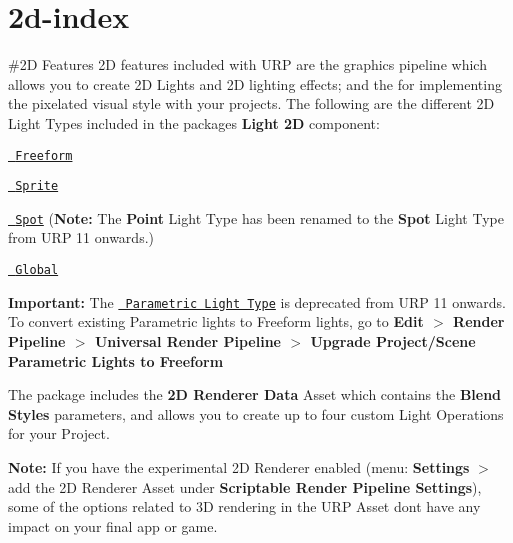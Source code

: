 \chapter{2d-\/index}
\hypertarget{md__hey_tea_9_2_library_2_package_cache_2com_8unity_8render-pipelines_8universal_0d14_80_88_2_documentation_0i_22d-index}{}\label{md__hey_tea_9_2_library_2_package_cache_2com_8unity_8render-pipelines_8universal_0d14_80_88_2_documentation_0i_22d-index}
\#2D  Features 2D features included with URP are the  graphics pipeline which allows you to create 2D Lights and 2D lighting effects; and the  for implementing the pixelated visual style with your projects. The following are the different 2D Light Types included in the package\textquotesingle{}s {\bfseries{Light 2D}} component\+:


\begin{DoxyItemize}
\item \href{LightTypes.md\#freeform}{\texttt{ Freeform}}
\item \href{LightTypes.md\#sprite}{\texttt{ Sprite}}
\item \href{LightTypes.md\#spot}{\texttt{ Spot}} ({\bfseries{Note\+:}} The {\bfseries{Point}} Light Type has been renamed to the {\bfseries{Spot}} Light Type from URP 11 onwards.)
\item \href{LightTypes.md\#global}{\texttt{ Global}}
\end{DoxyItemize}

{\bfseries{Important\+:}} The \href{LightTypes.md\#parametric}{\texttt{ Parametric Light Type}} is deprecated from URP 11 onwards. To convert existing Parametric lights to Freeform lights, go to {\bfseries{Edit \texorpdfstring{$>$}{>} Render Pipeline \texorpdfstring{$>$}{>} Universal Render Pipeline \texorpdfstring{$>$}{>} Upgrade Project/\+Scene Parametric Lights to Freeform}}



The package includes the {\bfseries{2D Renderer Data}} Asset which contains the {\bfseries{Blend Styles}} parameters, and allows you to create up to four custom Light Operations for your Project.

{\bfseries{Note\+:}} If you have the experimental 2D Renderer enabled (menu\+: {\bfseries{ Settings}} \texorpdfstring{$>$}{>} add the 2D Renderer Asset under {\bfseries{Scriptable Render Pipeline Settings}}), some of the options related to 3D rendering in the URP Asset don\textquotesingle{}t have any impact on your final app or game. 